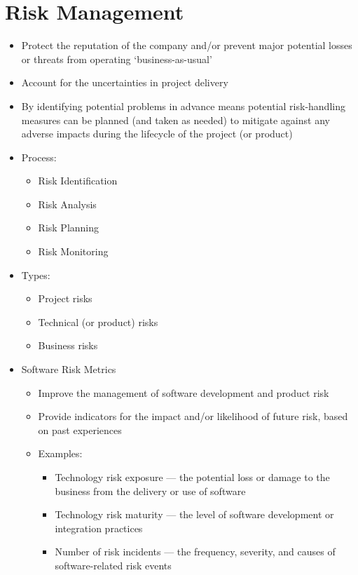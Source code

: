 \documentclass[12pt,openany]{book}
\begin{document}
\section{Risk Management}
\begin{itemize}
    \item Protect the reputation of the company and/or prevent major potential losses or threats from operating `business-as-usual'
    \item Account for the uncertainties in project delivery
    \item By identifying potential problems in advance means potential risk-handling measures can be planned (and taken as needed) to mitigate against any adverse impacts during the lifecycle of the project (or product)
    \item Process:
    \begin{itemize}
        \item Risk Identification
        \item Risk Analysis
        \item Risk Planning
        \item Risk Monitoring
    \end{itemize}
    \item Types:
    \begin{itemize}
        \item Project risks
        \item Technical (or product) risks
        \item Business risks
    \end{itemize}
    \item Software Risk Metrics
    \begin{itemize}
        \item Improve the management of software development and product risk
        \item Provide indicators for the impact and/or likelihood of future risk, based on past experiences
        \item Examples:
        \begin{itemize}
            \item Technology risk exposure --- the potential loss or damage to the business from the delivery or use of software
            \item Technology risk maturity --- the level of software development or integration practices
            \item Number of risk incidents --- the frequency, severity, and causes of software-related risk events

\end{itemize}
\end{itemize}
\end{itemize}
\end{document}
